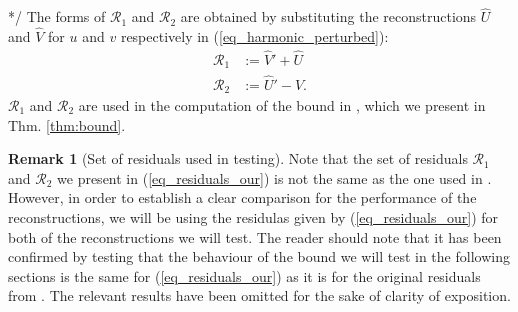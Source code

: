 \documentclass[12pt,a4paper]{article}
\numberwithin{equation}{section}
\theoremstyle{definition}
\newcommand{\rec}[1]{\widehat{{#1}}}
\newtheorem{Rem}[subsection]{Remark}
\begin{document}
*/
The forms of $\mathcal{R}_1$ and $\mathcal{R}_2$ are obtained by substituting the reconstructions $\rec{U}$ and $\rec{V}$ for $u$ and $v$ respectively in (\ref{eq_harmonic_perturbed}):
\begin{equation}\label{eq_residuals_our}
\begin{aligned}
\mathcal{R}_1&:=\hat{V}'+\hat{U}\\
\mathcal{R}_2&:=\hat{U}'-\hat{V}.
\end{aligned}
\end{equation}
$\mathcal{R}_1$ and $\mathcal{R}_2$ are used in the computation of the bound in \cite[Thm 3.1]{georgoulis2016posteriori}, which we present in Thm. \ref{thm:bound}.
\begin{Rem}[Set of residuals used in testing]
Note that the set of residuals $\mathcal{R}_1$ and $\mathcal{R}_2$ we present in (\ref{eq_residuals_our}) is not the same as the one used in \cite{georgoulis2016posteriori}.  However, in order to establish a clear comparison for the performance of the reconstructions, we will be using the residulas given by (\ref{eq_residuals_our}) for both of the reconstructions we will test.  The reader should note that it has been confirmed by testing that the behaviour of the bound we will test in the following sections is the same for (\ref{eq_residuals_our}) as it is for the original residuals from \cite{georgoulis2016posteriori}.  The relevant results have been omitted for the sake of clarity of exposition.
\end{Rem}
\end{document}
